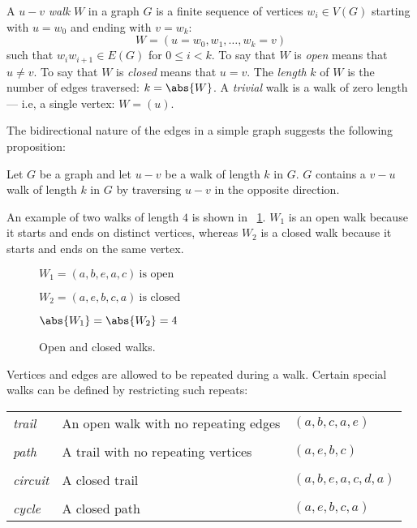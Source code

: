 A \(u-v\) \emph{walk} \(W\) in a graph \(G\) is a finite sequence of vertices \(w_i\in V(G)\) starting with
\(u=w_0\) and ending with \(v=w_k\):
\[W=(u=w_0,w_1,\ldots,w_k=v)\]
such that \(w_iw_{i+1}\in E(G)\) for \(0\le i<k\).  To say that \(W\) is \emph{open} means that \(u\ne v\).  To say
that \(W\) is \emph{closed} means that \(u=v\).  The \emph{length} \(k\) of \(W\) is the number of edges traversed:
\(k=\abs{W}\).  A \emph{trivial} walk is a walk of zero length --- i.e, a single vertex: \(W=(u)\).

The bidirectional nature of the edges in a simple graph suggests the following proposition:

\begin{proposition}
  Let \(G\) be a graph and let \(u-v\) be a walk of length \(k\) in \(G\).  \(G\) contains a \(v-u\) walk of length
  \(k\) in \(G\) by traversing \(u-v\) in the opposite direction.
\end{proposition}

An example of two walks of length \(4\) is shown in \figurename~\ref{fig:walks}.  \(W_1\) is an open walk because
it starts and ends on distinct vertices, whereas \(W_2\) is a closed walk because it starts and ends on the same
vertex.

\begin{figure}[H]
  \begin{minipage}{2.75in}
    \centering
  \end{minipage}
  \begin{minipage}{2.75in}
    \(W_1=(a,b,e,a,c)\ \text{is open}\)

    \(W_2=(a,e,b,c,a)\ \text{is closed}\)

    \bigskip

    \(\abs{W_1}=\abs{W_2}=4\)
  \end{minipage}
  \caption{Open and closed walks.}
  \label{fig:walks}
\end{figure}

Vertices and edges are allowed to be repeated during a walk.  Certain special walks can be defined by restricting
such repeats:

\begin{center}
  \begin{tabular}{lll}
    \emph{trail} & An open walk with no repeating edges & \((a,b,c,a,e)\) \\
    \\
    \emph{path} & A trail with no repeating vertices & \((a,e,b,c)\) \\
    \\
    \emph{circuit} & A closed trail & \((a,b,e,a,c,d,a)\) \\
    \\
    \emph{cycle} & A closed path & \((a,e,b,c,a)\)
  \end{tabular}
\end{center}


